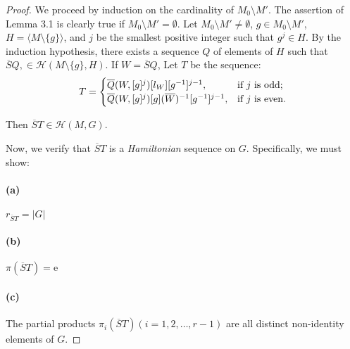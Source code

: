 \documentclass{article}
\begin{document}
\begin{proof}
We proceed by induction on the cardinality of $M_0 \setminus M'$. The assertion of Lemma 3.1 is clearly true if $M_0 \setminus M' = \emptyset$. Let $M_0 \setminus M' \neq \emptyset$, $g \in M_0 \setminus M'$, $H = \langle M \setminus \{g\} \rangle$, and $j$ be the smallest positive integer such that $g^j \in H$. By the induction hypothesis, there exists a sequence $Q$ of elements of $H$ such that $\overline{S}Q, \in \mathcal{H}(M \setminus \{g\}, H)$. If $W = \overline{S}Q$, 
Let \( T \) be the sequence:
\[
T =
\begin{cases} 
\overline{Q}(W, [g]^j)[l_W][g^{-1}]^{j-1}, & \text{if \( j \) is odd;} \\
\overline{Q}(W, [g]^j)[g](\overline{W})^{-1}[g^{-1}]^{j-1}, & \text{if \( j \) is even.}
\end{cases}
\]

Then $\overline{S}T \in \mathcal{H}(M, G)$.

Now, we verify that \( \overline{S}T \) is a \textit{Hamiltonian} sequence on \( G \). Specifically, we must show:
\paragraph{(a)} 
$r_{\overline{S}T} = |G|$
\paragraph{(b)}
$\pi(\overline{S}T) = \text{e}$
\paragraph{(c)} 
The partial products $\pi_i(\overline{S}T) (i = 1, 2, \dots, r - 1)$ are all distinct non-identity elements of $G$.



\end{proof}
\end{document}

